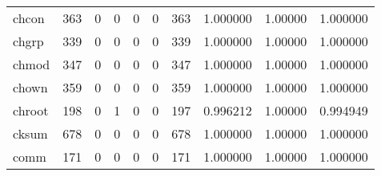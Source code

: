 \begin{longtable}{lrrrrrrrrr}
chcon     &                    363 &                                  0 &                                 0 &                                0 &                                 0 &                             363 &                                1.000000 &                                1.00000 &                             1.000000 \\
chgrp     &                    339 &                                  0 &                                 0 &                                0 &                                 0 &                             339 &                                1.000000 &                                1.00000 &                             1.000000 \\
chmod     &                    347 &                                  0 &                                 0 &                                0 &                                 0 &                             347 &                                1.000000 &                                1.00000 &                             1.000000 \\
chown     &                    359 &                                  0 &                                 0 &                                0 &                                 0 &                             359 &                                1.000000 &                                1.00000 &                             1.000000 \\
chroot    &                    198 &                                  0 &                                 1 &                                0 &                                 0 &                             197 &                                0.996212 &                                1.00000 &                             0.994949 \\
cksum     &                    678 &                                  0 &                                 0 &                                0 &                                 0 &                             678 &                                1.000000 &                                1.00000 &                             1.000000 \\
comm      &                    171 &                                  0 &                                 0 &                                0 &                                 0 &                             171 &                                1.000000 &                                1.00000 &                             1.000000 \\

\end{longtable}
